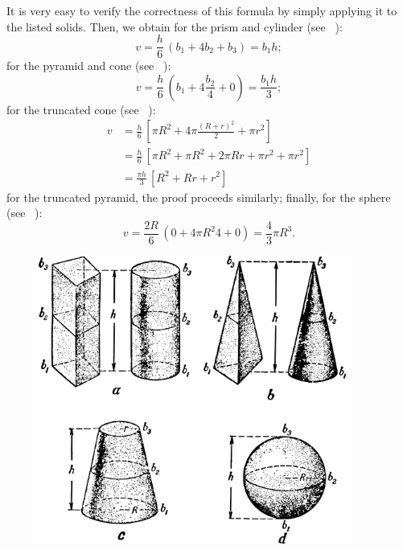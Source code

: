 \ans It is very easy to verify the correctness of this formula by simply applying it to the listed solids. Then, we obtain for the prism and cylinder (see ~):
\begin{equation*}%
v = \frac{h}{6}\, (b_{1} + 4b_{2} + b_{3}) = b_{1}h;
\end{equation*}
for the pyramid and cone (see ~):
\begin{equation*}%
v = \frac{h}{6}\, (b_{1} + 4\frac{b_{2}}{4} + 0) = \frac{b_{1}h}{3};
\end{equation*}
for the truncated cone (see ~):
\begin{align*}%
v & = \frac{h}{6}\, \left[ \pi R^{2} + 4 \pi \frac{(R + r)^{2}}{2} + \pi r^{2} \right] \\ 
& = \frac{h}{6}\, \left[ \pi R^{2} + \pi R^{2} + 2 \pi Rr +  \pi r^{2} + \pi r^{2} \right] \\ 
& = \frac{\pi h}{3}\, \left[ R^{2} + Rr + r^{2}\right]
\end{align*}
for the truncated pyramid, the proof proceeds similarly; finally, for the sphere (see ~):
\begin{equation*}%
v = \frac{2R}{6}\, (0 + 4 \pi R^{2}{4} + 0) = \frac{4}{3}\pi R^{3}.
\end{equation*}

\begin{figure}[h!]
\centering
\includegraphics[width=0.9\textwidth]{figures/ch-01/fig-01-17.pdf}
\end{figure}

